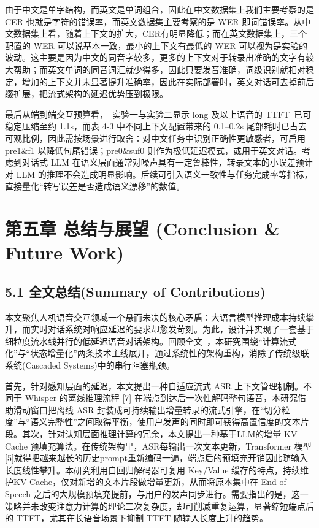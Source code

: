 \documentclass[UTF8,a4paper,12pt]{ctexart}
\begin{document}
由于中文是单字结构，而英文是单词组合，因此在中文数据集上我们主要考察的是 CER 也就是字符的错误率，而英文数据集主要考察的是 WER 即词错误率。从中文数据集上看，随着上下文的扩大，CER有明显降低；而在英文数据集上，三个配置的 WER 可以说基本一致，最小的上下文有最低的 WER 可以视为是实验的波动。这主要是因为中文的同音字较多，更多的上下文对于转录出准确的文字有较大帮助；而英文单词的同音词汇就少得多，因此只要发音准确，词级识别就相对稳定，增加的上下文并未显著提升准确率，因此在实际部署时，英文对话可去掉前后缀扩展，把流式架构的延迟优势压到极限。

最后从端到端交互预算看， 实验一与实验二显示 long 及以上语音的 TTFT 已可稳定压缩至约 1.1s，而表 4-3 中不同上下文配置带来的 0.1–0.2s 尾部耗时已占去可观比例，因此需按场景进行取舍：对中文任务中识别正确性更敏感者，可启用 pre1\&f1 以降低句尾错误；pre0\&suf0 则作为极低延迟模式，或用于英文对话。考虑到对话式 LLM 在语义层面通常对噪声具有一定鲁棒性，转录文本的小误差预计对 LLM 的推理不会造成明显影响。后续可引入语义一致性与任务完成率等指标，直接量化“转写误差是否造成语义漂移”的数值。  

\section*{第五章 总结与展望 (Conclusion \& Future Work)}


\subsection*{5.1 全文总结(Summary of Contributions)}


本文聚焦人机语音交互领域一个悬而未决的核心矛盾：大语言模型推理成本持续攀升，而实时对话系统对响应延迟的要求却愈发苛刻。为此，设计并实现了一套基于细粒度流水线并行的低延迟语音对话架构。回顾全文 ，本研究围绕“计算流式化”与“状态增量化”两条技术主线展开，通过系统性的架构重构，消除了传统级联系统(Cascaded Systems)中的串行阻塞瓶颈。  

首先，针对感知层面的延迟，本文提出一种自适应流式 ASR 上下文管理机制。不同于 Whisper 的离线推理流程 [7] 在端点到达后一次性解码整句语音，本研究借助滑动窗口把离线 ASR 封装成可持续输出增量转录的流式引擎，在“切分粒度”与“语义完整性”之间取得平衡，使用户发声的同时即可获得高置信度的文本片段。其次，针对认知层面推理计算的冗余，本文提出一种基于LLM的增量 KV Cache 预填充算法。在传统架构里，ASR每输出一次文本更新，Transformer 模型[5]就得把越来越长的历史prompt重新编码一遍，端点后的预填充开销因此随输入长度线性攀升。本研究利用自回归解码器可复用 Key/Value 缓存的特点，持续维护KV Cache，仅对新增的文本片段做增量更新，从而将原本集中在 End-of-Speech 之后的大规模预填充提前，与用户的发声同步进行。需要指出的是，这一策略并未改变注意力计算的理论二次复杂度，却可削减重复运算，显著缩短端点后的 TTFT，尤其在长语音场景下抑制 TTFT 随输入长度上升的趋势。  
\end{document}
